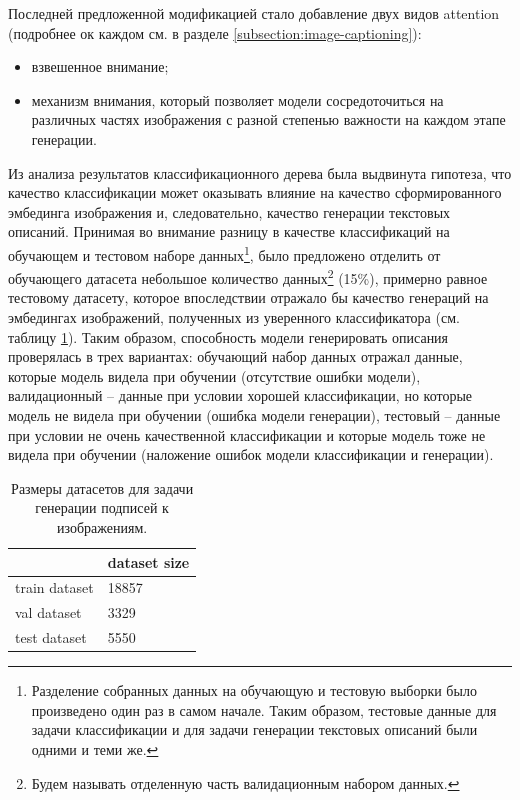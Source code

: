 \documentclass[a4paper,12pt]{extarticle}
\begin{document}
Последней предложенной модификацией стало добавление двух видов attention (подробнее ок каждом см. в разделе \ref{subsection:image-captioning}):
\begin{itemize}
	\item взвешенное внимание;
	\item механизм внимания, который позволяет модели сосредоточиться на различных частях изображения с разной степенью важности на каждом этапе генерации.
\end{itemize}

Из анализа результатов классификационного дерева была выдвинута гипотеза, что качество классификации может оказывать влияние на качество сформированного эмбединга изображения и, следовательно, качество генерации текстовых описаний. Принимая во внимание разницу в качестве классификаций на обучающем и тестовом наборе данных\footnote{Разделение собранных данных на обучающую и тестовую выборки было произведено один раз в самом начале. Таким образом, тестовые данные для задачи классификации и для задачи генерации текстовых описаний были одними и теми же.}, было предложено отделить от обучающего датасета небольшое количество данных\footnote{Будем называть отделенную часть валидационным набором данных.} (15\%), примерно равное тестовому датасету, которое впоследствии отражало бы качество генераций на эмбедингах изображений, полученных из уверенного классификатора (см. таблицу \ref{table:image-caption-dataset-size}). Таким образом, способность модели генерировать описания проверялась в трех вариантах: обучающий набор данных отражал данные, которые модель видела при обучении (отсутствие ошибки модели), валидационный – данные при условии хорошей классификации, но которые модель не видела при обучении (ошибка модели генерации), тестовый – данные при условии не очень качественной классификации и которые модель тоже не видела при обучении (наложение ошибок модели классификации и генерации).

\begin{table}[ht]
	\caption{Размеры датасетов для задачи генерации подписей к изображениям.}
	\label{table:image-caption-dataset-size}
	\footnotesize
	\centering
	\begin{tabular}{l|l}
		\toprule
		{} & \multicolumn{1}{c}{dataset size}\\
		\midrule
		train dataset & 18857\\
		val dataset   & 3329\\
		test dataset  & 5550\\
		\bottomrule
	\end{tabular}
\end{table}
\end{document}
